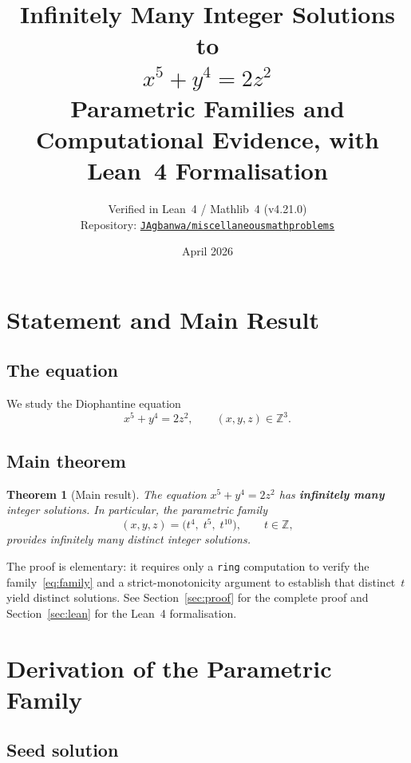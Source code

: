 \documentclass[12pt,a4paper]{article}
\title{%
  \Large\bfseries Infinitely Many Integer Solutions to\\[6pt]
  \Huge $x^5 + y^4 = 2z^2$\\[10pt]
  \large Parametric Families and Computational Evidence, with Lean~4 Formalisation
}
\author{%
  \normalsize Verified in Lean~4 / Mathlib~4 (v4.21.0)\\[2pt]
  \normalsize Repository: \href{https://github.com/JAgbanwa/miscellaneousmathproblems}%
    {\texttt{JAgbanwa/miscellaneousmathproblems}}
}
\date{\normalsize April 2026}
\newtheorem{theorem}{Theorem}[section]
\theoremstyle{definition}
\newcommand{\Z}{\mathbb{Z}}
\begin{document}
\maketitle
\tableofcontents
\newpage

\section{Statement and Main Result}\label{sec:intro}

\subsection{The equation}

We study the Diophantine equation
\begin{equation}\label{eq:main}
  x^5 + y^4 = 2z^2, \qquad (x,y,z)\in\Z^3. \tag{$\star$}
\end{equation}

\subsection{Main theorem}

\begin{theorem}[Main result]\label{thm:main}
  The equation $x^5 + y^4 = 2z^2$ has \textbf{infinitely many} integer solutions.
  In particular, the parametric family
  \begin{equation}\label{eq:family}
    (x, y, z) = \bigl(t^4,\; t^5,\; t^{10}\bigr), \qquad t \in \Z,
  \end{equation}
  provides infinitely many distinct integer solutions.
\end{theorem}

The proof is elementary: it requires only a \texttt{ring} computation to verify
the family~\eqref{eq:family} and a strict-monotonicity argument to establish
that distinct~$t$ yield distinct solutions.  See Section~\ref{sec:proof} for the
complete proof and Section~\ref{sec:lean} for the Lean~4 formalisation.

\section{Derivation of the Parametric Family}\label{sec:derivation}

\subsection{Seed solution}
\end{document}

